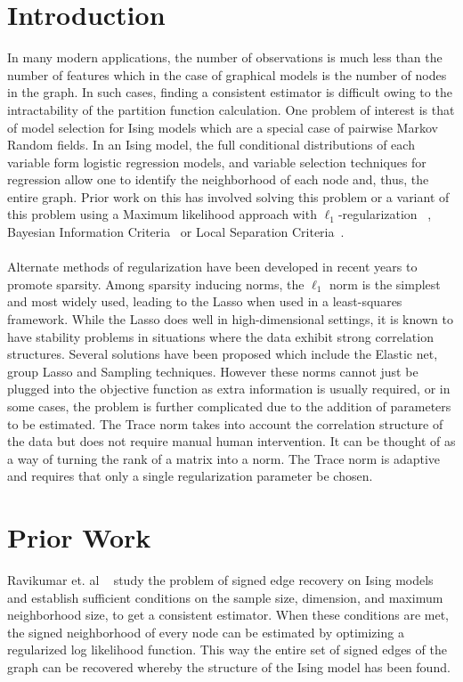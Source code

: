 \documentclass[11pt]{article}
\begin{document}
\section{Introduction}
In many modern applications, the number of observations is much less than the number of features which in the case of graphical models is the number of nodes in the graph. In such cases, finding a consistent estimator is difficult owing to the intractability of the partition function calculation. One problem of interest is that of model selection for Ising models which are a special case of pairwise Markov Random fields. In an Ising model, the full conditional distributions of each variable form logistic regression models, and variable selection techniques for regression allow one to identify the neighborhood of each node and, thus, the entire graph. Prior work on this has involved solving this problem or a variant of this problem using a Maximum likelihood approach with $\ell_1$-regularization ~\cite{ravikumar2010high}, Bayesian Information Criteria~\cite{barber2015high} or Local Separation Criteria~\cite{anandkumar2012high}. \\ \\
Alternate methods of regularization have been developed in recent years to promote sparsity. Among sparsity inducing norms, the $\ell_1$ norm is the simplest and most widely used, leading to the Lasso when used in a least-squares framework. While the Lasso does well in high-dimensional settings, it is known to have stability problems in situations where the data exhibit strong correlation structures. Several solutions have been proposed which include the Elastic net, group Lasso and Sampling techniques. However these norms cannot just be plugged into the objective function as extra information is usually required, or in some cases, the problem is further complicated due to the addition of parameters to be estimated. The Trace norm takes into account the correlation structure of the data but does not require manual human intervention. It can be thought of as a way of turning the rank of a matrix into a norm. The Trace norm is adaptive and requires that only a single regularization parameter be chosen. 	

\section{Prior Work}
Ravikumar et. al ~\cite{ravikumar2010high} study the problem of signed edge recovery on Ising models and establish sufficient conditions on the sample size, dimension, and maximum neighborhood size, to get a consistent estimator. When these conditions are met, the signed neighborhood of every node can be estimated by optimizing a regularized log likelihood function. This way the entire set of signed edges of the graph can be recovered whereby the structure of the Ising model has been found. 
\end{document}
